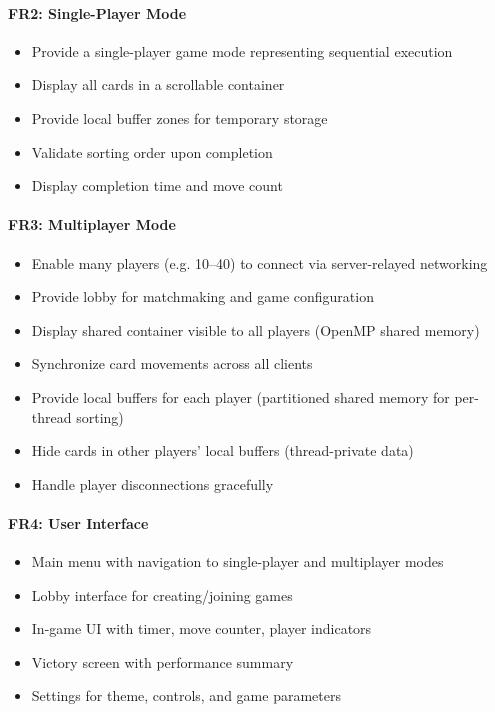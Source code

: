 \paragraph*{FR2: Single-Player Mode}
\begin{itemize}
    \item Provide a single-player game mode representing sequential execution
    \item Display all cards in a scrollable container
    \item Provide local buffer zones for temporary storage
    \item Validate sorting order upon completion
    \item Display completion time and move count
\end{itemize}

\paragraph*{FR3: Multiplayer Mode}
\begin{itemize}
    \item Enable many players (e.g. 10--40) to connect via server-relayed networking
    \item Provide lobby for matchmaking and game configuration
    \item Display shared container visible to all players (OpenMP shared memory)
    \item Synchronize card movements across all clients
    \item Provide local buffers for each player (partitioned shared memory for per-thread sorting)
    \item Hide cards in other players' local buffers (thread-private data)
    \item Handle player disconnections gracefully
\end{itemize}

\paragraph*{FR4: User Interface}
\begin{itemize}
    \item Main menu with navigation to single-player and multiplayer modes
    \item Lobby interface for creating/joining games
    \item In-game UI with timer, move counter, player indicators
    \item Victory screen with performance summary
    \item Settings for theme, controls, and game parameters
\end{itemize}

